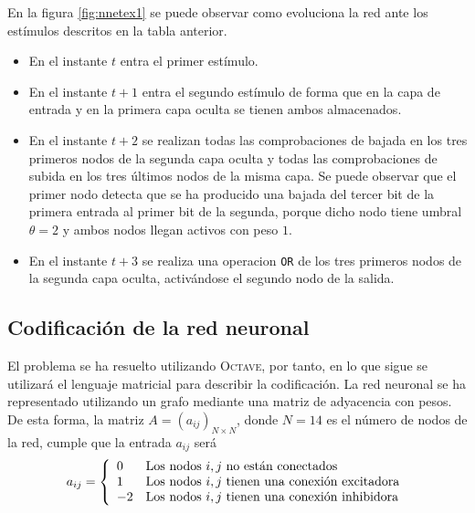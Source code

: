\documentclass[spanish]{assignment}
\begin{document}
	En la figura \ref{fig:nnetex1} se puede observar como evoluciona la red ante los estímulos descritos en la tabla anterior.
	
	
	\begin{itemize}
	\item En el instante $t$ entra el primer estímulo.
	\item En el instante $t+1$ entra el segundo estímulo de forma que en la capa de entrada y en la primera capa oculta se tienen ambos almacenados.
	\item En el instante $t+2$ se realizan todas las comprobaciones de bajada en los tres primeros nodos de la segunda capa oculta y todas las comprobaciones de subida en los tres últimos nodos de la misma capa. Se puede observar que el primer nodo detecta que se ha producido una bajada del tercer bit de la primera entrada al primer bit de la segunda, porque dicho nodo tiene umbral $\theta=2$ y ambos nodos llegan activos con peso $1$.
	
	\item En el instante $t+3$ se realiza una operacion \texttt{OR} de los tres primeros nodos de la segunda capa oculta, activándose el segundo nodo de la salida.
	\end{itemize} 
	
	\subsection{Codificación de la red neuronal}
	El problema se ha resuelto utilizando \textsc{Octave}, por tanto, en lo que sigue se utilizará el lenguaje matricial para describir la codificación. La red neuronal se ha representado utilizando un grafo mediante una matriz de adyacencia con pesos. De esta forma, la matriz $A = (a_{ij})_{N\times N}$, donde $N=14$ es el número de nodos de la red, cumple que la entrada $a_{ij}$ será
	\begin{equation*}
		a_{ij} = 
		\left\{
		\begin{array}{l l}
		0 & \text{Los nodos } i,j \text{ no están conectados}\\
		1 & \text{Los nodos } i,j \text{ tienen una conexión excitadora}\\
		-2 & \text{Los nodos } i,j \text{ tienen una conexión inhibidora}
		\end{array}
		\right.
	\end{equation*}
	
\end{document}
